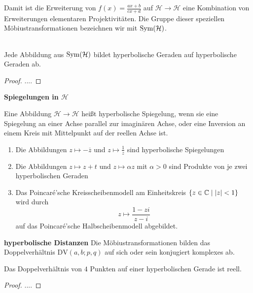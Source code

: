   Damit ist die Erweiterung von $\displaystyle{f(x)=\frac{ax+b}{cx+d}}$ auf $\mathcal{H}\to \mathcal{H}$ eine Kombination von Erweiterungen elementaren Projektivitäten.
  Die Gruppe dieser speziellen Möbiustransformationen bezeichnen wir mit $\operatorname{Sym}(\mathcal{H})$.

  \begin{thm} \ \\
    Jede Abbildung aus $\operatorname{Sym}(\mathcal{H})$ bildet hyperbolische Geraden auf hyperbolische Geraden ab.
  \end{thm}
  \begin{proof}
   ....
  \end{proof}

  \textbf{Spiegelungen in $\mathcal{H}$}
  \begin{defi}
    Eine Abbildung $\mathcal{H}\to \mathcal{H}$ heißt hyperbolische Spiegelung, wenn sie eine Spiegelung an einer Achse parallel zur imaginären Achse, oder eine
    Inversion an einem Kreis mit Mittelpunkt auf der reellen Achse ist.
  \end{defi}

  \begin{bem}
    \begin{enumerate}[(1)]
      \item Die Abbildungen $z\mapsto -\overline{z}$ und $z\mapsto \frac{1}{\overline{z}}$ sind hyperbolische Spiegelungen
      \item Die Abbildungen $z\mapsto z+t$ und $z\mapsto \alpha z$ mit $\alpha>0$ sind Produkte von je zwei hyperbolischen Geraden
      \item Das Poincaré'sche Kreisscheibenmodell am Einheitskreis $\lbrace z\in \mathbb C \mid \lvert z \rvert <1 \rbrace$ wird durch
            \begin{equation*}
              z \mapsto \frac{1-zi}{z-i}
            \end{equation*}
            auf das Poincaré'sche Halbscheibenmodell abgebildet.
    \end{enumerate}
  \end{bem}
  \textbf{hyperbolische Distanzen}
  Die Möbiustransformationen bilden das Doppelverhältnis $\text{DV}(a,b;p,q)$ auf sich oder sein konjugiert komplexes ab.
  \begin{thm}
    Das Doppelverhältnis von $4$ Punkten auf einer hyperbolischen Gerade ist reell.
  \end{thm}
  \begin{proof}
    ....
  \end{proof}

